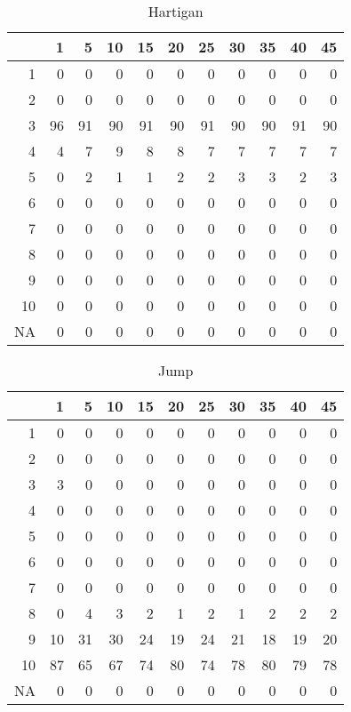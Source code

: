 \documentclass[11pt]{article}
\begin{document}
\begin{table}[H]
\centering
\begin{tabular}{rrrrrrrrrrr}
  \hline
 & 1 & 5 & 10 & 15 & 20 & 25 & 30 & 35 & 40 & 45 \\ 
  \hline
1 & 0 & 0 & 0 & 0 & 0 & 0 & 0 & 0 & 0 & 0 \\ 
  2 & 0 & 0 & 0 & 0 & 0 & 0 & 0 & 0 & 0 & 0 \\ 
  3 & 96 & 91 & 90 & 91 & 90 & 91 & 90 & 90 & 91 & 90 \\ 
  4 & 4 & 7 & 9 & 8 & 8 & 7 & 7 & 7 & 7 & 7 \\ 
  5 & 0 & 2 & 1 & 1 & 2 & 2 & 3 & 3 & 2 & 3 \\ 
  6 & 0 & 0 & 0 & 0 & 0 & 0 & 0 & 0 & 0 & 0 \\ 
  7 & 0 & 0 & 0 & 0 & 0 & 0 & 0 & 0 & 0 & 0 \\ 
  8 & 0 & 0 & 0 & 0 & 0 & 0 & 0 & 0 & 0 & 0 \\ 
  9 & 0 & 0 & 0 & 0 & 0 & 0 & 0 & 0 & 0 & 0 \\ 
  10 & 0 & 0 & 0 & 0 & 0 & 0 & 0 & 0 & 0 & 0 \\ 
  NA & 0 & 0 & 0 & 0 & 0 & 0 & 0 & 0 & 0 & 0 \\ 
   \hline
\end{tabular}
\caption{Hartigan} 
\end{table}
\begin{table}[H]
\centering
\begin{tabular}{rrrrrrrrrrr}
  \hline
 & 1 & 5 & 10 & 15 & 20 & 25 & 30 & 35 & 40 & 45 \\ 
  \hline
1 & 0 & 0 & 0 & 0 & 0 & 0 & 0 & 0 & 0 & 0 \\ 
  2 & 0 & 0 & 0 & 0 & 0 & 0 & 0 & 0 & 0 & 0 \\ 
  3 & 3 & 0 & 0 & 0 & 0 & 0 & 0 & 0 & 0 & 0 \\ 
  4 & 0 & 0 & 0 & 0 & 0 & 0 & 0 & 0 & 0 & 0 \\ 
  5 & 0 & 0 & 0 & 0 & 0 & 0 & 0 & 0 & 0 & 0 \\ 
  6 & 0 & 0 & 0 & 0 & 0 & 0 & 0 & 0 & 0 & 0 \\ 
  7 & 0 & 0 & 0 & 0 & 0 & 0 & 0 & 0 & 0 & 0 \\ 
  8 & 0 & 4 & 3 & 2 & 1 & 2 & 1 & 2 & 2 & 2 \\ 
  9 & 10 & 31 & 30 & 24 & 19 & 24 & 21 & 18 & 19 & 20 \\ 
  10 & 87 & 65 & 67 & 74 & 80 & 74 & 78 & 80 & 79 & 78 \\ 
  NA & 0 & 0 & 0 & 0 & 0 & 0 & 0 & 0 & 0 & 0 \\ 
   \hline
\end{tabular}
\caption{Jump} 
\end{table}
\end{document}
